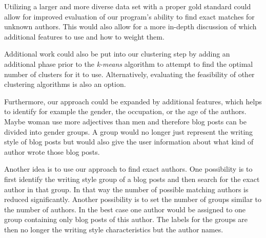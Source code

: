 Utilizing a larger and more diverse data set with a proper gold standard could allow for improved evaluation of our program’s ability to find exact matches for unknown authors.
This would also allow for a more in-depth discussion of which additional features to use and how to weight them.


Additional work could also be put into our clustering step by adding an additional phase prior to the \textit{k-means} algorithm to attempt to find the optimal number of clusters for it to use.
Alternatively, evaluating the feasibility of other clustering algorithms is also an option.


Furthermore, our approach could be expanded by additional features, which helps to identify for example the gender, the occupation, or the age of the authors.
Maybe woman use more adjectives than men and therefore blog posts can be divided into gender groups.
A group would no longer just represent the writing style of blog posts but would also give the user information about what kind of author wrote those blog posts.


Another idea is to use our approach to find exact authors.
One possibility is to first identify the writing style group of a blog posts and then search for the exact author in that group.
In that way the number of possible matching authors is reduced significantly.
Another possibility is to set the number of groups similar to the number of authors.
In the best case one author would be assigned to one group containing only blog posts of this author.
The labels for the groups are then no longer the writing style characteristics but the author names.
